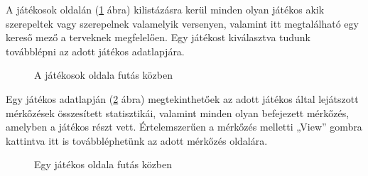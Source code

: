 A játékosok oldalán (\ref{fig:playersTest} ábra) kilistázásra kerül minden olyan játékos akik szerepeltek vagy szerepelnek valamelyik versenyen, valamint itt megtalálható egy kereső mező a terveknek megfelelően. Egy játékost kiválasztva tudunk továbblépni az adott játékos adatlapjára. 

\begin{figure}[h]
\centering
{}
\caption{A játékosok oldala futás közben}
\label{fig:playersTest}
\end{figure}

Egy játékos adatlapján (\ref{fig:playerTest} ábra) megtekinthetőek az adott játékos által lejátszott mérkőzések összesített statisztikái, valamint minden olyan befejezett mérkőzés, amelyben a játékos részt vett. Értelemszerűen a mérkőzés melletti „View” gombra kattintva itt is továbbléphetünk az adott mérkőzés oldalára.

\begin{figure}[h]
\centering
{}
\caption{Egy játékos oldala futás közben}
\label{fig:playerTest}
\end{figure}